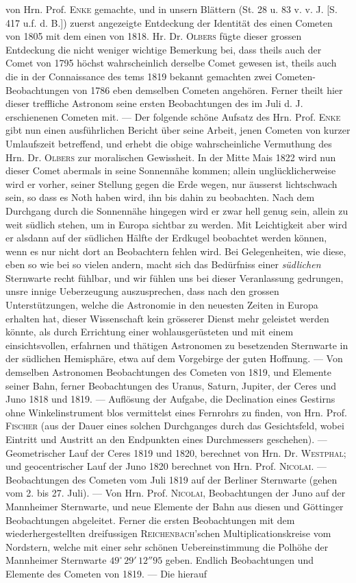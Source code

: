 \noindent von Hrn. Prof. \textsc{Enke} gemachte, und in unsern Blättern (St. 28 u. 83 v. v. J. [S. 417 u.f. d. B.]) zuerst angezeigte Entdeckung der Identität des einen Cometen von 1805 mit dem einen von 1818. Hr. Dr. \textsc{Olbers} fügte dieser grossen Entdeckung die nicht weniger wichtige Bemerkung bei, dass theils auch der Comet von 1795 höchst wahrscheinlich derselbe Comet gewesen ist, theils auch die in der Connaissance des tems 1819 bekannt gemachten zwei Cometen-Beobachtungen von 1786 eben demselben Cometen angehören. Ferner theilt hier dieser treffliche Astronom seine ersten Beobachtungen des im Juli d. J. erschienenen Cometen mit. --- Der folgende schöne Aufsatz des Hrn. Prof. \textsc{Enke} gibt nun einen ausführlichen Bericht über seine Arbeit, jenen Cometen von kurzer Umlaufszeit betreffend, und erhebt die obige wahrscheinliche Vermuthung des Hrn. Dr. \textsc{Olbers} zur moralischen Gewissheit. In der Mitte Mais 1822 wird nun dieser Comet abermals in seine Sonnennähe kommen; allein unglücklicherweise wird er vorher, seiner Stellung gegen die Erde wegen, nur äusserst lichtschwach sein, so dass es Noth haben wird, ihn bis dahin zu beobachten. Nach dem Durchgang durch die Sonnennähe hingegen wird er zwar hell genug sein, allein zu weit südlich stehen, um in Europa sichtbar zu werden. Mit Leichtigkeit aber wird er alsdann auf der südlichen Hälfte der Erdkugel beobachtet werden können, wenn es nur nicht dort an Beobachtern fehlen wird. Bei Gelegenheiten, wie diese, eben so wie bei so vielen andern, macht sich das Bedürfniss einer \emph{südlichen} Sternwarte recht fühlbar, und wir fühlen uns bei dieser Veranlassung gedrungen, unsre innige Ueberzeugung auszusprechen, dass nach den grossen Unterstützungen, welche die Astronomie in den neuesten Zeiten in Europa erhalten hat, dieser Wissenschaft kein grösserer Dienst mehr geleistet werden könnte, als durch Errichtung einer wohlausgerüsteten und mit einem einsichtsvollen, erfahrnen und thätigen Astronomen zu besetzenden Sternwarte in der südlichen Hemisphäre, etwa auf dem Vorgebirge der guten Hoffnung. --- Von demselben Astronomen Beobachtungen des Cometen von 1819, und Elemente seiner Bahn, ferner Beobachtungen des Uranus, Saturn, Jupiter, der Ceres und Juno 1818 und 1819. --- Auflösung der Aufgabe, die Declination eines Gestirns ohne Winkelinstrument blos vermittelst eines Fernrohrs zu finden, von Hrn. Prof. \textsc{Fischer} (aus der Dauer eines solchen Durchganges durch das Gesichtsfeld, wobei Eintritt und Austritt an den Endpunkten eines Durchmessers geschehen). --- Geometrischer Lauf der Ceres 1819 und 1820, berechnet von Hrn. Dr. \textsc{Westphal}; und geocentrischer Lauf der Juno 1820 berechnet von Hrn. Prof. \textsc{Nicolai}. --- Beobachtungen des Cometen vom Juli 1819 auf der Berliner Sternwarte (gehen vom 2. bis 27. Juli). --- Von Hrn. Prof. \textsc{Nicolai}, Beobachtungen der Juno auf der Mannheimer Sternwarte, und neue Elemente der Bahn aus diesen und Göttinger Beobachtungen abgeleitet. Ferner die ersten Beobachtungen mit dem wiederhergestellten dreifussigen \textsc{Reichenbach}'schen Multiplicationskreise vom Nordstern, welche mit einer sehr schönen Uebereinstimmung die Polhöhe der Mannheimer Sternwarte $49^\circ\,29'\,12''95$ geben. Endlich Beobachtungen und Elemente des Cometen von 1819. --- Die hierauf 